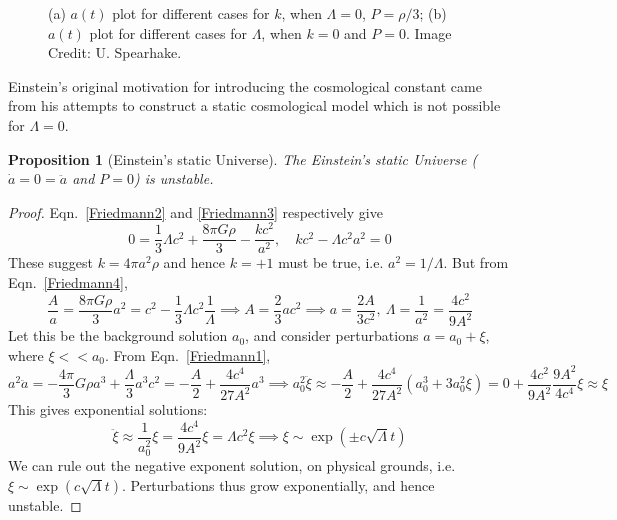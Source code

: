 \documentclass[a4paper]{article}
\theoremstyle{new}
\newtheorem{prop}{Proposition}[section]
\begin{document}
\begin{figure}[H]
\begin{minipage}{\linewidth}
\end{minipage}
    \caption{(a) $a(t)$ plot for different cases for $k$, when $\Lambda=0$, $P=\rho/3$; (b) $a(t)$ plot for different cases for $\Lambda$, when $k=0$ and $P=0$. Image Credit: U. Spearhake.}
\end{figure}
Einstein’s original motivation for introducing the cosmological constant came from his attempts to construct a static cosmological model which is not possible for $\Lambda=0$.
\begin{prop}[Einstein's static Universe]
The Einstein's static Universe ($\dot{a}=0=\ddot{a}$ and $P=0$) is unstable.
\end{prop}
\begin{proof}
Eqn.~\ref{Friedmann2} and \ref{Friedmann3} respectively give
$$0=\frac{1}{3}\Lambda c^2+\frac{8\pi G\rho}{3}-\frac{kc^2}{a^2},\quad kc^2-\Lambda c^2a^2=0$$
These suggest $k=4\pi a^2\rho$ and hence $k=+1$ must be true, i.e. $a^2=1/\Lambda$. But from Eqn.~\ref{Friedmann4},
$$\frac{A}{a}=\frac{8\pi G\rho}{3}a^2=c^2-\frac{1}{3}\Lambda c^2\frac{1}{\Lambda}\implies A=\frac{2}{3}ac^2\implies a=\frac{2A}{3c^2},~\Lambda=\frac{1}{a^2}=\frac{4c^2}{9A^2}$$
Let this be the background solution $a_0$, and consider perturbations $a=a_0+\xi$, where $\xi<<a_0$. From Eqn.~\ref{Friedmann1},
$$a^2\ddot{a}=-\frac{4\pi}{3}G\rho a^3+\frac{\Lambda}{3}a^3c^2=-\frac{A}{2}+\frac{4c^4}{27A^2}a^3\implies a_0^2\ddot{\xi}\approx-\frac{A}{2}+\frac{4c^4}{27A^2}(a_0^3+3a_0^2\xi)=0+\frac{4c^2}{9A^2}\frac{9A^2}{4c^4}\xi\approx\xi$$
This gives exponential solutions:
$$\ddot{\xi}\approx\frac{1}{a_0^2}\xi=\frac{4c^4}{9A^2}\xi=\Lambda c^2\xi\implies\xi\sim\exp(\pm c\sqrt{\Lambda}t)$$
We can rule out the negative exponent solution, on physical grounds, i.e. $\xi\sim\exp(c\sqrt{\Lambda}t)$. Perturbations thus grow exponentially, and hence unstable.
\end{proof}
\end{document}

